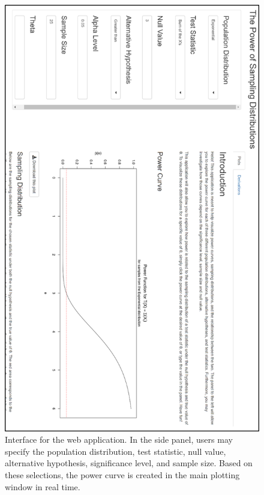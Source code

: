 \documentclass{TISE}
\begin{document}
\begin{figure}[H]
	\centering
	\includegraphics[scale=1]{app_layout.png}
	\caption{Interface for the web application. In the side panel, users may specify the population distribution, test statistic, null value, alternative hypothesis, significance level, and sample size. Based on these selections, the power curve is created in the main plotting window in real time.}
\end{figure}
\end{document}
